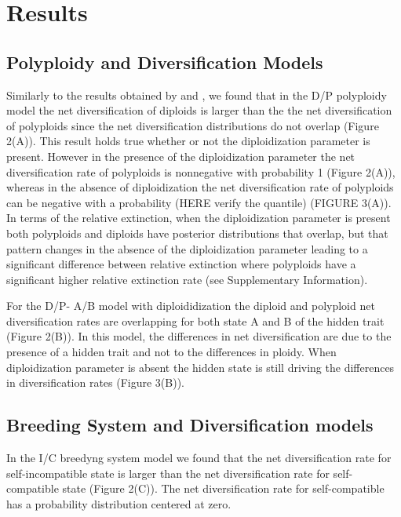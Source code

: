 \section{Results}
\subsection{Polyploidy and Diversification Models}
Similarly to the results obtained by \citet{mayrose_2011} and \citet{mayrose_2015}, we found that in the D/P polyploidy model the net diversification of diploids is larger than the the net diversification of polyploids since the net diversification distributions do not overlap (Figure 2(A)). This result holds true whether or not the diploidization parameter is present. However in the presence of  the diploidization parameter the net diversification rate of polyploids is nonnegative with probability 1 (Figure 2(A)), whereas in the absence of diploidization the net diversification rate of polyploids can be negative with a probability (HERE verify the quantile) (FIGURE 3(A)). In terms of the relative extinction, when the diploidization parameter is present both polyploids and diploids have posterior distributions that overlap, but that pattern changes in the absence of the diploidization parameter leading to a significant difference between relative extinction where polyploids have a significant higher relative extinction rate (see Supplementary Information).\newline

For the D/P- A/B model with diploididization the diploid and polyploid net diversification rates are overlapping for both state A and B of the hidden trait (Figure 2(B)). In this model, the differences in net diversification are due to the presence of a hidden trait and not to the differences in ploidy. When diploidization parameter is absent the hidden state is still driving the differences in diversification rates (Figure 3(B)).

\subsection{Breeding System and Diversification models }
In the I/C breedyng system model we found that the net diversification rate for self-incompatible state is larger than the net diversification rate for self-compatible state (Figure 2(C)). The net diversification rate for self-compatible has a probability distribution centered at zero.  \newline

